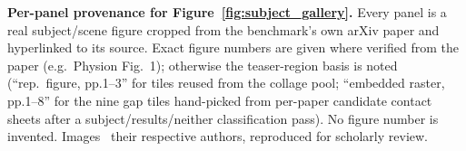 \begin{table}[t]
\caption{\textbf{Per-panel provenance for Figure~\ref{fig:subject_gallery}.} Every panel is a real
subject/scene figure cropped from the benchmark's own arXiv paper and hyperlinked to its source.
Exact figure numbers are given where verified from the paper (e.g.\ Physion Fig.~1); otherwise the
teaser-region basis is noted (``rep.\ figure, pp.1--3'' for tiles reused from the collage pool;
``embedded raster, pp.1--8'' for the nine gap tiles hand-picked from per-paper candidate contact
sheets after a subject/results/neither classification pass). No figure number is invented. Images
\textcopyright\ their respective authors, reproduced for scholarly review.}
\label{tab:panel_provenance}
\end{table}
